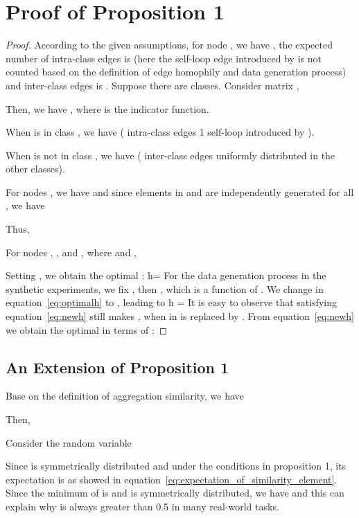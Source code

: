 \documentclass{article}
\newcommand{\beq}{}
\newcommand{\0}{{\boldsymbol{0}}}
\newcommand{\6}{{\partial}}
\newcommand{\8}{{\infty}}
\newcommand{\4}{{\nabla}}
\def\eqref#1{equation~\ref{#1}}
\begin{document}
\section{Proof of Proposition 1}
\label{appendix:proof_theorem1}
\begin{proof}


According to the given assumptions, for node , we have , the expected number of intra-class edges is  (here the self-loop edge introduced by  is not counted based on the definition of edge homophily and data generation process) and inter-class edges is . Suppose there are  classes. Consider matrix ,

Then, we have , where  is the indicator function.

When  is in class , we have  ( intra-class edges  1 self-loop introduced by ).

When  is not in class , we have  ( inter-class edges uniformly distributed in the other  classes).

\iffalse

where  is the indicator function. 
\fi
For nodes , we have  and since elements in  and  are independently generated for all , we have

Thus,


For nodes , , and ,
where  and , 

Setting , we obtain the optimal :
\beq \label{eq:optimalh}
h= 
\eeq
For the data generation process in the synthetic experiments, 
we fix , then , which is a function of .
We change  in \eqref{eq:optimalh} to , leading to
\beq \label{eq:newh}
h = 
\eeq
It is easy to observe that  satisfying \eqref{eq:newh} still makes , when  in  
is replaced by .
From \eqref{eq:newh} we obtain the optimal  in terms of :


\iffalse
Then using Markov's inequality, we have

\fi
\end{proof}
\subsection{An Extension of Proposition 1}
\label{appendix:extension_of_proposition1}
Base on the definition of aggregation similarity, we have

Then,

Consider the random variable

Since  is symmetrically distributed and under the conditions in proposition 1, its expectation is  as showed in \eqref{eq:expectation_of_similarity_element}. Since the minimum of  is  and  is symmetrically distributed, we have  and this can explain why  is always greater than 0.5 in many real-world tasks.
\end{document}
